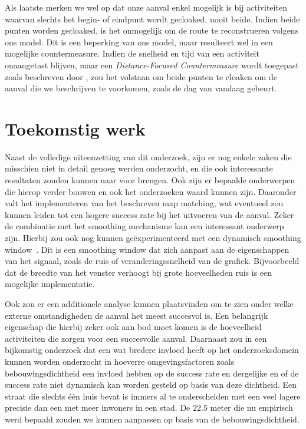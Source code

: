 Als laatste merken we wel op dat onze aanval enkel mogelijk is bij activiteiten
waarvan slechts het begin- of eindpunt wordt gecloaked, nooit beide. Indien
beide punten worden gecloaked, is het onmogelijk om de route te reconstrueren
volgens ons model. Dit is een beperking van ons model, maar resulteert wel in
een mogelijke countermeasure. Indien de snelheid en tijd van een activiteit
onaangetast blijven, maar een \textit{Distance-Focused Countermeasure} wordt
toegepast zoals beschreven door \citeauthor{Dhondt}, zou het volstaan om beide
punten te cloaken om de aanval die we beschrijven te voorkomen, zoals de dag
van vandaag gebeurt.

\section{Toekomstig werk}
Naast de volledige uiteenzetting van dit onderzoek, zijn er nog enkele zaken
die misschien niet in detail genoeg werden onderzocht, en die ook interessante
resultaten zouden kunnen naar voor brengen. Ook zijn er bepaalde onderwerpen
die hierop verder bouwen en ook het onderzoeken waard kunnen zijn. Daaronder
valt het implementeren van het beschreven map matching, wat eventueel zou
kunnen leiden tot een hogere success rate bij het uitvoeren van de aanval.
Zeker de combinatie met het smoothing mechanisme kan een interessant onderwerp
zijn. Hierbij zou ook nog kunnen geëxperimenteerd met een dynamisch smoothing
window~\cite{shmoothing}. Dit is een smoothing window dat zich aanpast aan de
eigenschappen van het signaal, zoals de ruis of veranderingssnelheid van de
grafiek. Bijvoorbeeld dat de breedte van het venster verhoogt bij grote
hoeveelheden ruis is een mogelijke implementatie.

Ook zou er een additionele analyse kunnen plaatsvinden om te zien onder welke
externe omstandigheden de aanval het meest succesvol is. Een belangrijk
eigenschap die hierbij zeker ook aan bod moet komen is de hoeveelheid
activiteiten die zorgen voor een succesvolle aanval. Daarnaast zou in een
bijkomstig onderzoek dat een wat bredere invloed heeft op het onderzoeksdomein
kunnen worden onderzocht in hoeverre omgevingsfactoren zoals
bebouwingsdichtheid een invloed hebben op de success rate en dergelijke en of
de success rate niet dynamisch kan worden gesteld op basis van deze dichtheid.
Een straat die slechts één huis bevat is immers al te onderscheiden met een
veel lagere precisie dan een met meer inwoners in een stad. De $22.5$ meter die
nu empirisch werd bepaald zouden we kunnen aanpassen op basis van de
bebouwingsdichtheid.

